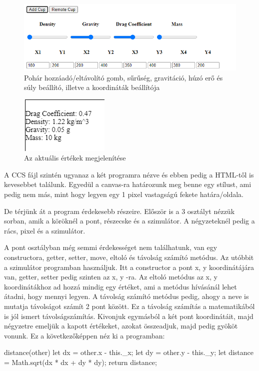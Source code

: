\begin{figure}[h]
	\centering
	\includegraphics[scale=1]{images/html.png}
	\caption{Pohár hozzáadó/eltávolító gomb, sűrűség, gravitáció, húzó erő és súly beállító, illetve a koordináták beállítója}
	\label{fig:html}
\end{figure}

\begin{figure}[h]
	\centering
	\includegraphics[scale=1]{images/ertekek.png}
	\caption{Az aktuális értékek megjelenítése}
	\label{fig:ertekek}
\end{figure}


A CCS fájl szintén ugyanaz a két programra nézve és ebben pedig a HTML-től is kevesebbet találunk. Egyedül a canvas-ra határozunk meg benne egy stílust, ami pedig nem más, mint hogy legyen egy 1 pixel vastagságú fekete határa/oldala.


De térjünk át a program érdekesebb részeire. Először is a 3 osztályt nézzük sorban, amik a köröknél a pont, részecske és a szimulátor.
A négyzeteknél pedig a rács, pixel és a szimulátor.


A pont osztályban még semmi érdekességet nem találhatunk, van egy constructora, getter, setter, move, eltoló és távolság számító metódus. Az utóbbit a szimulátor programban használjuk. Itt a constructor a pont x, y koordinátájára van, getter, setter pedig szinten az x, y -ra. Az eltoló metódus az x, y koordinátákhoz ad hozzá mindig egy értéket, ami a metódus hívásánál lehet átadni, hogy mennyi legyen. A távolság számító metódus pedig, ahogy a neve is mutatja távolságot számít 2 pont között. Ez a távolság számítás a matematikából is jól ismert távolságszámítás. Kivonjuk egymásból a két pont koordinátáit, majd négyzetre emeljük a kapott értékeket, azokat összeadjuk, majd pedig gyököt vonunk. Ez a következőképpen néz ki a programban:
\begin{java}
	distance(other)
	{
		let dx = other.x - this._x;
		let dy = other.y - this._y;
		let distance = Math.sqrt(dx * dx + dy * dy);
		return distance;
	}
\end{java} 

